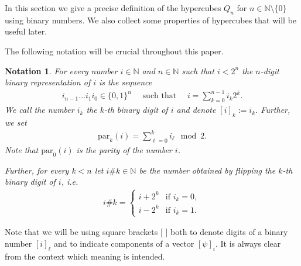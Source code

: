 \documentclass[a4paper]{amsart}
\newcommand{\N}{\mathbb{N}}
\newtheorem{notation}[thm]{Notation}
\begin{document}
In this section we give a precise definition of the hypercubes $Q_n$ for $n \in \N \setminus \{0\}$ using binary numbers. We also collect some properties of hypercubes that will be useful later. 

The following notation will be crucial throughout this paper.

\begin{notation}
    \label{pre::notation:binary_numbers}
    For every number $i \in \N$ and $n \in \N$ such that $i < 2^n$ the $n$-digit binary representation of $i$ is the sequence 
    \begin{align*}
        i_{n-1} \dots i_1 i_0 \in \{0,1\}^n \quad \text{ such that } \quad i = \sum_{k=0}^{n-1} i_k 2^{k}.
    \end{align*}
    We call the number $i_k$ the $k$-th binary digit of $i$ and denote $[i]_k := i_k$. Further, we set
    \begin{align*}
        \mathrm{par}_k(i) = \sum_{\ell=0}^{k} i_\ell \mod 2.
    \end{align*}
    Note that $\mathrm{par}_0(i)$ is the parity of the number $i$.

    Further, for every $k < n$ let $i \# k \in \N$ be the number obtained by flipping the $k$-th binary digit of $i$, i.e. 
    \begin{align*}
        i \# k = \begin{cases}
            i + 2^{k} & \text{if } i_k = 0, \\
            i - 2^{k} & \text{if } i_k = 1.
        \end{cases}
    \end{align*}
\end{notation}

Note that we will be using square brackets $[$ $]$ both to denote digits of a binary number $[i]_\ell$ and to indicate components of a vector $[\psi]_i$. It is always clear from the context which meaning is intended.
\end{document}

